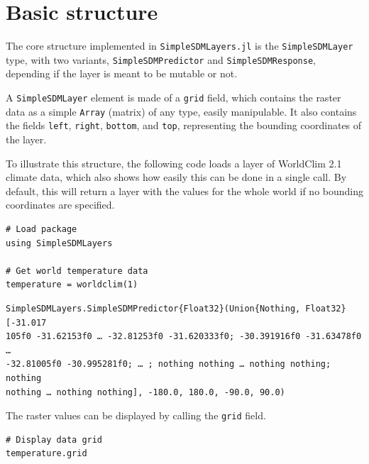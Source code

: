 \documentclass[
]{article}
\begin{document}
\hypertarget{basic-structure}{%
\section{Basic structure}\label{basic-structure}}

The core structure implemented in
\texttt{SimpleSDMLayers.jl} is the
\texttt{SimpleSDMLayer} type, with two variants,
\texttt{SimpleSDMPredictor} and
\texttt{SimpleSDMResponse}, depending if the layer is meant
to be mutable or not.

A \texttt{SimpleSDMLayer} element is made of a
\texttt{grid} field, which contains the raster data as a
simple \texttt{Array} (matrix) of any type, easily
manipulable. It also contains the fields \texttt{left},
\texttt{right}, \texttt{bottom}, and
\texttt{top}, representing the bounding coordinates of the
layer.

To illustrate this structure, the following code loads a layer of
WorldClim 2.1 climate data, which also shows how easily this can be done
in a single call. By default, this will return a layer with the values
for the whole world if no bounding coordinates are specified.

\begin{verbatim}
# Load package
using SimpleSDMLayers

# Get world temperature data
temperature = worldclim(1)
\end{verbatim}

\begin{verbatim}
SimpleSDMLayers.SimpleSDMPredictor{Float32}(Union{Nothing, Float32}[-31.017
105f0 -31.62153f0 … -32.81253f0 -31.620333f0; -30.391916f0 -31.63478f0 … 
-32.81005f0 -30.995281f0; … ; nothing nothing … nothing nothing; nothing 
nothing … nothing nothing], -180.0, 180.0, -90.0, 90.0)
\end{verbatim}

The raster values can be displayed by calling the
\texttt{grid} field.

\begin{verbatim}
# Display data grid
temperature.grid
\end{verbatim}
\end{document}
